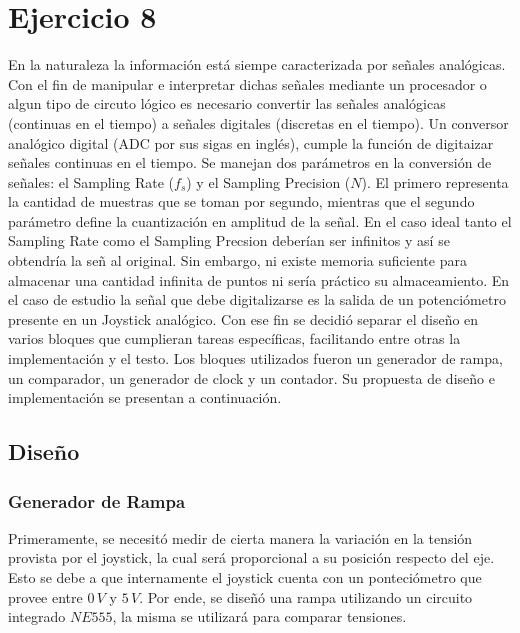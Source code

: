\section{Ejercicio 8}
En la naturaleza la informaci\'on est\'a siempe caracterizada por señales anal\'ogicas. Con el fin de manipular e interpretar dichas señales mediante un procesador o algun tipo de circuto l\'ogico es necesario convertir las señales anal\'ogicas (continuas en el tiempo) a señales digitales (discretas en el tiempo). Un conversor anal\'ogico digital (ADC por sus sigas en ingl\'es), cumple la funci\'on de digitaizar señales continuas en el tiempo. Se manejan dos par\'ametros en la conversi\'on de señales: el Sampling Rate ($f_s$) y el Sampling Precision ($N$). El primero representa la cantidad de muestras que se toman por segundo, mientras que el segundo par\'ametro define la cuantizaci\'on en amplitud de la señal. En el caso ideal tanto el Sampling Rate como el Sampling Precsion deber\'ian ser infinitos y as\'i se obtendr\'ia la señ al original. Sin embargo, ni existe memoria suficiente para almacenar una cantidad infinita de puntos ni ser\'ia pr\'actico su almaceamiento. En el caso de estudio la señal que debe digitalizarse es la salida de un potenci\'ometro presente en un Joystick anal\'ogico. Con ese fin se decidió separar el diseño en varios bloques que cumplieran tareas específicas, facilitando entre otras la implementación y el testo. Los bloques utilizados fueron un generador de rampa, un comparador, un generador de clock y un contador. Su propuesta de diseño e implementación se presentan a continuación. \par

\subsection{Diseño}

\subsubsection{Generador de Rampa}

Primeramente, se necesitó medir de cierta manera la variación en la tensión provista por el joystick, la cual será proporcional a su posición respecto del eje. Esto se debe a que internamente el joystick cuenta con un ponteciómetro que provee entre $0\,V$ y $5\,V$. Por ende, se diseñó una rampa utilizando un circuito integrado $NE555$, la misma se utilizará para comparar tensiones. \par

